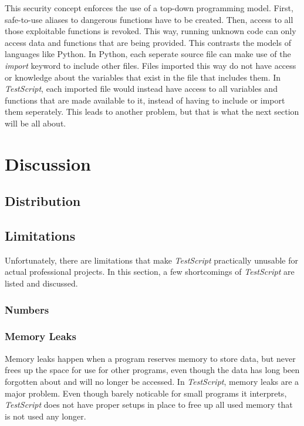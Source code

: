 \documentclass[12pt,a4paper]{article}
\newcommand{\name}{\emph{TestScript}}
\begin{document}
This security concept enforces the use of a top-down programming model. First, safe-to-use aliases
to dangerous functions have to be created. Then, access to all those exploitable functions is
revoked. This way, running unknown code can only access data and functions that are being provided.
This contrasts the models of languages like Python. In Python, each seperate source file can
make use of the \emph{import} keyword to include other files. Files imported this way do not
have access or knowledge about the variables that exist in the file that includes them.
In \name{}, each imported file would instead have access to all variables and functions that
are made available to it, instead of having to include or import them seperately.
This leads to another problem, but that is what the next section will be all about.

\section{Discussion}

\subsection{Distribution}

\subsection{Limitations}\label{Limitations}
Unfortunately, there are limitations that make \name{} practically unusable for actual
professional projects. In this section, a few shortcomings of \name{} are listed
and discussed.

\subsubsection{Numbers}

\subsubsection{Memory Leaks}
Memory leaks happen when a program reserves memory to store data, but
never frees up the space for use for other programs, even though the data
has long been forgotten about and will no longer be accessed.
In \name{}, memory leaks are a major problem. Even though barely noticable for small
programs it interprets, \name{} does not have proper setups in place to free up
all used memory that is not used any longer.
\end{document}
